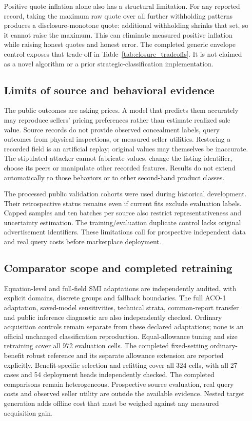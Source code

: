 \documentclass[10pt,journal]{IEEEtran}
\begin{document}
Positive quote inflation alone also has a structural limitation. For
any reported record, taking the maximum raw quote over all further
withholding patterns produces a disclosure-monotone quote: additional
withholding shrinks that set, so it cannot raise the maximum. This can
eliminate measured positive inflation while raising honest quotes and
honest error. The completed generic envelope control exposes that
trade-off in Table~\ref{tab:closure_tradeoffs}. It is not claimed as a
novel algorithm or a prior strategic-classification implementation.

\subsection{Limits of source and behavioral evidence}
The public outcomes are asking prices. A model that predicts them
accurately may reproduce sellers' pricing preferences rather than
estimate realized sale value. Source records do not provide observed
concealment labels, query outcomes from physical inspections, or
measured seller utilities. Restoring a recorded field is an artificial
replay; original values may themselves be inaccurate. The stipulated
attacker cannot fabricate values, change the listing identifier, choose
its peers or manipulate other recorded features. Results do not extend
automatically to those behaviors or to other second-hand product classes.

The processed public validation cohorts were used during historical
development. Their retrospective status remains even if current fits
exclude evaluation labels. Capped samples and ten batches per source
also restrict representativeness and uncertainty estimation. The
training/evaluation duplicate control lacks original advertisement
identifiers. These limitations call for prospective independent data
and real query costs before marketplace deployment.

\subsection{Comparator scope and completed retraining}
Equation-level and full-field SMI adaptations are independently audited,
with explicit domains, discrete groups and fallback boundaries. The full
ACO-1 adaptation, saved-model sensitivities, technical strata, common-report
transfer and public inference diagnostic are also independently checked.
Ordinary acquisition controls remain separate from these declared
adaptations; none is an official unchanged classification reproduction.
Equal-allowance tuning and size retraining cover all 972 evaluation cells.
The completed fixed-setting ordinary-benefit robust reference and its separate
allowance extension are reported explicitly. Benefit-specific selection and
refitting cover all 324 cells, with all 27 cases and 54 deployment heads
independently checked. The completed comparisons remain heterogeneous.
Prospective source evaluation, real query costs and observed seller utility
are outside the available evidence. Nested target generation adds offline
cost that must be weighed against any measured acquisition gain.
\end{document}
